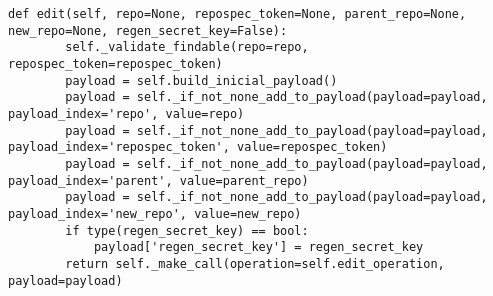 \begin{lstlisting}[breaklines]
    def edit(self, repo=None, repospec_token=None, parent_repo=None, new_repo=None, regen_secret_key=False):
        self._validate_findable(repo=repo, repospec_token=repospec_token)
        payload = self.build_inicial_payload()
        payload = self._if_not_none_add_to_payload(payload=payload, payload_index='repo', value=repo)
        payload = self._if_not_none_add_to_payload(payload=payload, payload_index='repospec_token', value=repospec_token)
        payload = self._if_not_none_add_to_payload(payload=payload, payload_index='parent', value=parent_repo)
        payload = self._if_not_none_add_to_payload(payload=payload, payload_index='new_repo', value=new_repo)
        if type(regen_secret_key) == bool:
            payload['regen_secret_key'] = regen_secret_key
        return self._make_call(operation=self.edit_operation, payload=payload)
\end{lstlisting}
\lstset{language=Bash}

